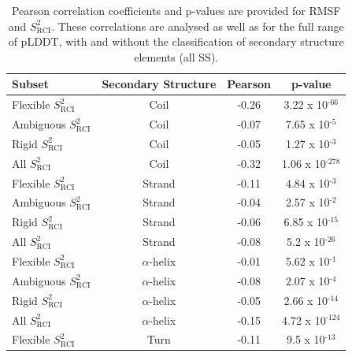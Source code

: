 \begin{table}[H]
\centering
\small
\caption{Pearson correlation coefficients and p-values are provided for RMSF and $S_{\text{RCI}}^{2}$. These correlations are analysed as well as for the full range of pLDDT, with and without the classification of secondary structure elements (all SS).}
\label{tab:plddt_sup:suptable8}
\begin{tabular}{@{}lccc@{}}
\toprule
Subset                         & Secondary Structure & \multicolumn{1}{c}{Pearson} & \multicolumn{1}{c}{p-value}  \\ \midrule
Flexible $S_{\text{RCI}}^{2}$  & Coil                & -0.26                       & 3.22 x 10$^{\text{-66}}$     \\
Ambiguous $S_{\text{RCI}}^{2}$ & Coil                & -0.07                       & 7.65 x 10$^{\text{-5}}$      \\
Rigid $S_{\text{RCI}}^{2}$     & Coil                & -0.05                       & 1.27 x 10$^{\text{-3}}$      \\
All $S_{\text{RCI}}^{2}$       & Coil                & -0.32                       & 1.06 x 10$^{\text{-278}}$    \\
\arrayrulecolor[gray]{0.8}\hline
Flexible $S_{\text{RCI}}^{2}$  & Strand              & -0.11                       & 4.84 x 10$^{\text{-3}}$      \\
Ambiguous $S_{\text{RCI}}^{2}$ & Strand              & -0.04                       & 2.57 x 10$^{\text{-2}}$      \\
Rigid $S_{\text{RCI}}^{2}$     & Strand              & -0.06                       & 6.85 x 10$^{\text{-15}}$     \\
All $S_{\text{RCI}}^{2}$       & Strand              & -0.08                       & 5.2 x 10$^{\text{-26}}$      \\
\arrayrulecolor[gray]{0.8}\hline
Flexible $S_{\text{RCI}}^{2}$  & $\alpha$-helix      & -0.01                       & 5.62 x 10$^{\text{-1}}$      \\
Ambiguous $S_{\text{RCI}}^{2}$ & $\alpha$-helix      & -0.08                       & 2.07 x 10$^{\text{-4}}$      \\
Rigid $S_{\text{RCI}}^{2}$     & $\alpha$-helix      & -0.05                       & 2.66 x 10$^{\text{-14}}$     \\
All $S_{\text{RCI}}^{2}$       & $\alpha$-helix      & -0.15                       & 4.72 x 10$^{\text{-124}}$    \\
\arrayrulecolor[gray]{0.8}\hline
Flexible $S_{\text{RCI}}^{2}$  & Turn                & -0.11                       & 9.5 x 10$^{\text{-13}}$      \\

\end{tabular}
\end{table}
